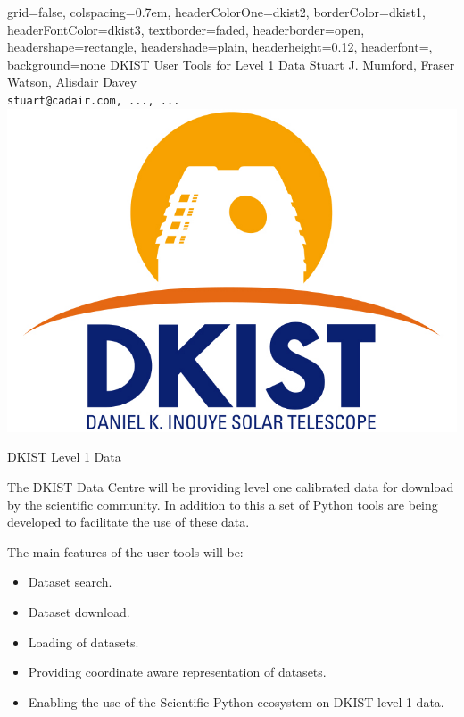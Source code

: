 \documentclass[landscape,a0paper,fontscale=0.32]{baposter}
\begin{document}
\begin{poster}{
 grid=false,
 colspacing=0.7em,
 headerColorOne=dkist2,
 borderColor=dkist1,
 headerFontColor=dkist3,
 textborder=faded,
 headerborder=open,
 headershape=rectangle,
 headershade=plain,
 headerheight=0.12\textheight,
 headerfont={\bfseries},
 background=none
 }
 {
 }
 {\sc\Huge DKIST User Tools for Level 1 Data}
 {Stuart J. Mumford, Fraser Watson, Alisdair Davey\\[1em]
 {\texttt{stuart@cadair.com, ..., ...}}}
 {
 \includegraphics[height=0.08\textheight]{dkistlogo.jpg}
 }

 
\begin{posterbox}[name=intro,column=0,row=0,span=2]{DKIST Level 1 Data}

  The DKIST Data Centre will be providing level one calibrated data for download
  by the scientific community. In addition to this a set of Python tools are
  being developed to facilitate the use of these data.

  The main features of the user tools will be:
  \begin{itemize}
  \item Dataset search.
  \item Dataset download.
  \item Loading of datasets.
  \item Providing coordinate aware representation of datasets.
  \item Enabling the use of the Scientific Python ecosystem on DKIST level 1
    data.
  \end{itemize}


\end{posterbox}
\end{poster}
\end{document}
